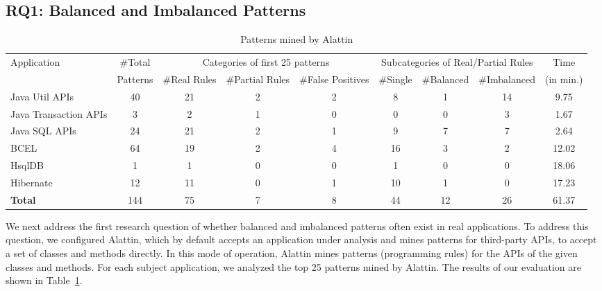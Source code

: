 \subsection{RQ1: Balanced and Imbalanced Patterns}
\label{sec:balimbalpats}

\setlength{\tabcolsep}{1pt}
\begin{table}[t]
\begin{SmallOut}
\begin{CodeOut}
\begin{center}
\centering \caption {\label{tab:minedpatterns} Patterns mined by Alattin}
\begin {tabular} {|l|c|c|c|c|c|c|c|c|}
\hline
Application&\#Total&\multicolumn{3}{|c|}{Categories of first 25 patterns}&\multicolumn{3}{|c|}{Subcategories of Real/Partial Rules}&Time\\
\cline{3-5}
\cline{6-8}
&Patterns&\#Real Rules&\#Partial Rules&\#False Positives&\#Single&\#Balanced&\#Imbalanced&(in min.)\\
\hline
\hline Java Util APIs&40&21&2&2&8&1&14& 9.75\\
\hline Java Transaction APIs&3&2&1&0&0&0&3& 1.67 \\
\hline Java SQL APIs&24&21&2&1&9&7&7& 2.64 \\
\hline BCEL&64&19&2&4&16&3&2& 12.02 \\
\hline HsqlDB&1&1&0&0&1&0&0& 18.06 \\
\hline Hibernate&12&11&0&1&10&1&0& 17.23 \\
\hline \textbf{Total}& 144 & 75 & 7 & 8 & 44 & 12 & 26 & 61.37 \\
\hline
\end{tabular}\vspace*{-5ex}
\end{center}
\end{CodeOut}
\end{SmallOut}
\end{table}

We next address the first research question of whether balanced and imbalanced patterns often exist in real applications. To address this question, we configured Alattin, which by default accepts an application under analysis and mines patterns for third-party APIs, to accept a set of classes and methods directly. In this mode of operation, Alattin mines patterns (programming rules) for the APIs of the given classes and methods. For each subject application, we analyzed the top 25 patterns mined by Alattin. The results of our evaluation are shown in Table~\ref{tab:minedpatterns}.

